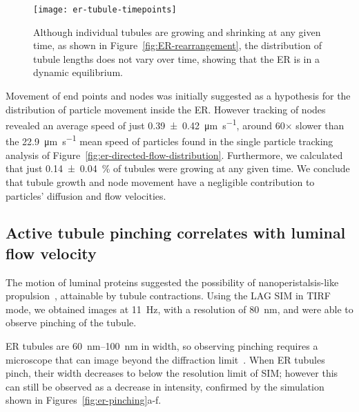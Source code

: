 \begin{figure}[htbp!]
\centering
\texttt{[image: er-tubule-timepoints]}
\caption[ER: Distribution of tubule length remains constant despite growing and shrinking of individual tubules]{Although individual tubules are growing and shrinking at any given time, as shown in Figure~\ref{fig:ER-rearrangement}, the distribution of tubule lengths does not vary over time, showing that the ER is in a dynamic equilibrium. } 
\label{fig:er-tubule-timepoints}
\end{figure}

Movement of end points and nodes was initially suggested as a hypothesis for the distribution of particle movement inside the ER. 
However tracking of nodes revealed an average speed of just \SI[separate-uncertainty=true]{0.39 \pm 0.42}{\micro\metre\per\second}, around 60$\times$ slower than the \SI{22.9}{\micro\metre\per\second} mean speed of particles found in the single particle tracking analysis of Figure~\ref{fig:er-directed-flow-distribution}. 
Furthermore, we calculated that just \SI[separate-uncertainty=true]{0.14 \pm 0.04}{\percent} of tubules were growing at any given time. 
We conclude that tubule growth and node movement have a negligible contribution to particles' diffusion and flow velocities. 


\subsection{Active tubule pinching correlates with luminal flow velocity}
The motion of luminal proteins suggested the possibility of nanoperistalsis-like propulsion~\cite{nadeem2014mathematical}, attainable by tubule contractions. 
Using the LAG SIM in TIRF mode, we obtained images at \SI{11}{\hertz}, with a resolution of \SI{80}{\nano\metre}, and were able to observe pinching of the tubule. 

ER tubules are \SIrange{60}{100}{\nano\metre} in width, so observing pinching requires a microscope that can image beyond the diffraction limit~\cite{lippincott1989rapid}. 
When ER tubules pinch, their width decreases to below the resolution limit of SIM; however this can still be observed as a decrease in intensity, confirmed by the simulation shown in Figures~\ref{fig:er-pinching}a-f. 

